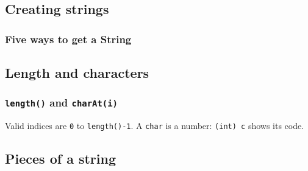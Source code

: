 \documentclass[aspectratio=169,10pt,compress]{beamer}
\begin{document}
\subsection[Create]{Creating strings}




\begin{frame}[t,fragile] \frametitle{Five ways to get a String}
\end{frame}

\subsection[Length]{Length and characters}




\begin{frame}[t,fragile] \frametitle{\texttt{length()} and \texttt{charAt(i)}}

  \vspace{0.3em}
  \small Valid indices are \texttt{0} to \texttt{length()-1}. A \texttt{char} is a number: \texttt{(int) c} shows its code.
\end{frame}

\subsection[Substring]{Pieces of a string}
\end{document}
